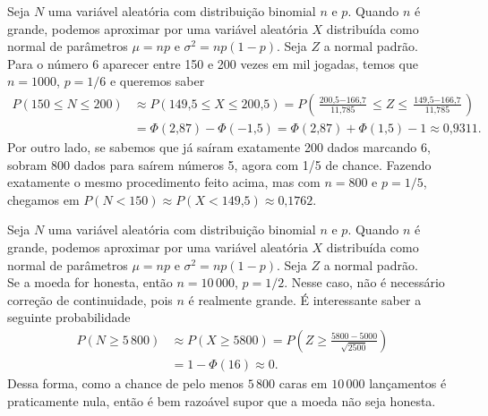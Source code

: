 \begin{questions}
\setcounter{question}{22}
\begin{solution}
	Seja $N$ uma variável aleatória com distribuição binomial $n$ e $p$. Quando $n$ é grande, podemos aproximar por uma variável aleatória $X$ distribuída como normal de parâmetros $\mu=np$ e $\sigma^2=np(1-p)$. Seja $Z$ a normal padrão.\\
    Para o número 6 aparecer entre 150 e 200 vezes em mil jogadas, temos que $n=1000$, $p=1/6$ e queremos saber
    \begin{align*}
    	P(150\le N\le 200)
        	&\approx P(\text{149,5} \le X \le \text{200,5})
            	= P(\tfrac{\text{200,5}-\text{166,7}}{\text{11,785}} \le Z 
            	\le \tfrac{\text{149,5}-\text{166,7}}{\text{11,785}})\\
            &= \Phi(\text{2,87}) - \Phi(-\text{1,5})
            	= \Phi(\text{2,87})+\Phi(\text{1,5})-1 \approx \text{0,9311}.
    \end{align*}
    Por outro lado, se sabemos que já saíram exatamente 200 dados marcando 6, sobram 800 dados para saírem números 5, agora com 1/5 de chance. Fazendo exatamente o mesmo procedimento feito acima, mas com $n=800$ e $p=1/5$, chegamos em $P(N<150)\approx P(X<\text{149,5})\approx \text{0,1762}$.
\end{solution}

\setcounter{question}{27}
\begin{solution}
	Seja $N$ uma variável aleatória com distribuição binomial $n$ e $p$. Quando $n$ é grande, podemos aproximar por uma variável aleatória $X$ distribuída como normal de parâmetros $\mu=np$ e $\sigma^2=np(1-p)$. Seja $Z$ a normal padrão.\\
    Se a moeda for honesta, então $n=10\,000$, $p=1/2$. Nesse caso, não é necessário correção de continuidade, pois $n$ é realmente grande. É interessante saber a seguinte probabilidade
    \begin{align*}
    	P(N\ge 5\,800)
        	&\approx P( X \ge \text{5800} )
            	= P(Z \ge \tfrac{5800-5000}{\sqrt{2500}})\\
            &= 1-\Phi(16) \approx 0.
    \end{align*}
    Dessa forma, como a chance de pelo menos $5\,800$ caras em $10\,000$ lançamentos é praticamente nula, então é bem razoável supor que a moeda não seja honesta.
\end{solution}


\end{questions}
